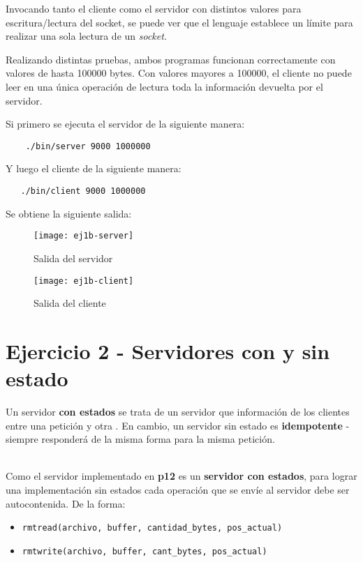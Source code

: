 Invocando tanto el cliente como el servidor con distintos valores para escritura/lectura del socket, se puede ver que el lenguaje establece un límite para realizar una sola lectura de un \emph{socket}.

Realizando distintas pruebas, ambos programas funcionan correctamente con valores de hasta 100000 bytes. Con valores mayores a 100000, el cliente no puede leer en una única operación de lectura toda la información devuelta por el servidor.

Si primero se ejecuta el servidor de la siguiente manera:

\begin{lstlisting}
    ./bin/server 9000 1000000
\end{lstlisting}

Y luego el cliente de la siguiente manera:

\begin{lstlisting}
   ./bin/client 9000 1000000 
\end{lstlisting}

Se obtiene la siguiente salida:

\begin{figure}[H]
    \centering
    \texttt{[image: ej1b-server]}
    \caption{Salida del servidor}
\end{figure}

\begin{figure}[H]
    \centering
    \texttt{[image: ej1b-client]}
    \caption{Salida del cliente}
\end{figure}

\section{Ejercicio 2 - Servidores con y sin estado}

Un servidor \textbf{con estados} se trata de un servidor que  información de los clientes entre una petición y otra \autocite{StatefulStateless}. En cambio, un servidor sin estado es \textbf{idempotente} - siempre responderá de la misma forma para la misma petición. 

~\\

Como el servidor implementado en \textbf{p12} es un \textbf{servidor con estados}, para lograr una implementación sin estados cada operación que se envíe al servidor debe ser autocontenida. De la forma:

\begin{itemize}
    \item \texttt{rmtread(archivo, buffer, cantidad\_bytes, pos\_actual)} 
    \item \texttt{rmtwrite(archivo, buffer, cant\_bytes, pos\_actual)} 
\end{itemize}

